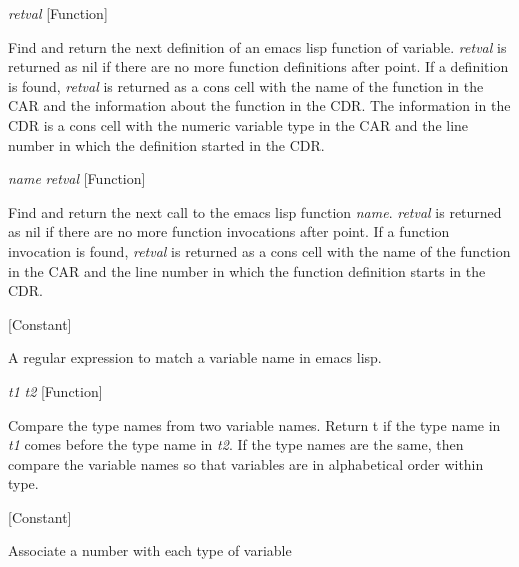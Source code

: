 \vspace{1em}
\noindent
{}
\usebox{\funcname}\emph{retval}
 \hfill [Function]

\begin{doc-string}
Find and return the next definition of an emacs lisp function of variable.
   \emph{retval} is returned
as nil if there are no more function definitions after point.  If a definition
is found, \emph{retval} is returned as a cons cell with the name of the function
in the CAR and the information about the function in the CDR.  The information in the
CDR is a cons cell with the numeric variable type in the CAR and the line number in
which the definition started in the CDR.
\end{doc-string}

\vspace{1em}
\noindent
{}
\usebox{\funcname}\emph{name} \emph{retval}
 \hfill [Function]

\begin{doc-string}
Find and return the next call to the emacs lisp function \emph{name}.  \emph{retval} is returned
as nil if there are no more function invocations after point.  If a function
invocation is found, \emph{retval} is returned as a cons cell with the name of the function
in the CAR and the line number in which the function definition starts in the CDR.
\end{doc-string}

\vspace{1em}
\noindent
{}
\usebox{\funcname}
 \hfill [Constant]

\begin{doc-string}
A regular expression to match a variable name in emacs lisp.
\end{doc-string}

\vspace{1em}
\noindent
{}
\usebox{\funcname}\emph{t1} \emph{t2}
 \hfill [Function]

\begin{doc-string}
Compare the type names from two variable names.  Return t if the type
name in \emph{t1} comes before the type name in \emph{t2}.  If the type names are the same,
then compare the variable names so that variables are in alphabetical order
within type.
\end{doc-string}

\vspace{1em}
\noindent
{}
\usebox{\funcname}
 \hfill [Constant]

\begin{doc-string}
Associate a number with each type of variable
\end{doc-string}

